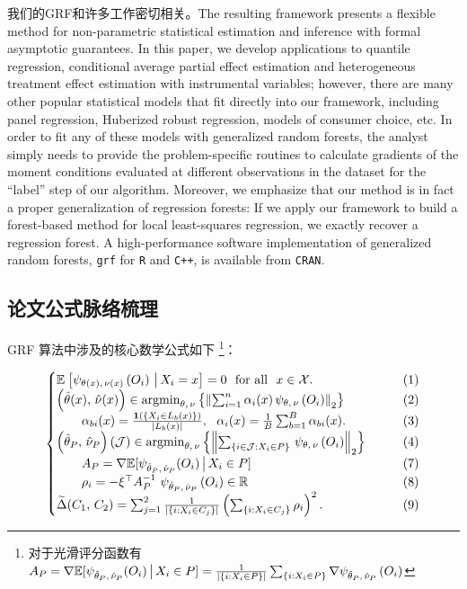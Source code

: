 \documentclass[aos]{imsart}
\theoremstyle{plain}
\theoremstyle{definition}
\theoremstyle{remark}
\begin{document}
\begin{CJK}{UTF8}{gbsn}
我们的GRF和许多工作密切相关。The resulting framework presents a flexible method for non-parametric
statistical estimation and inference with formal asymptotic guarantees. In this paper, we develop applications to quantile regression, conditional average partial effect estimation and heterogeneous treatment effect estimation with instrumental variables; however,
there are many other popular statistical models that fit directly into our framework, including panel regression, Huberized robust regression, models of consumer choice, etc. In order to fit any of these models with generalized random forests, the analyst simply needs to provide the problem-specific routines to calculate gradients of the moment conditions evaluated at different observations in the dataset for the ``label'' step of our algorithm. Moreover, we emphasize that our method is in fact a proper generalization of regression forests: If we apply our framework to build a forest-based method for local least-squares regression, 
we exactly recover a regression forest.
A high-performance software implementation of generalized random forests,
\texttt{grf} for \texttt{R} and \texttt{C++}, is available from \texttt{CRAN}.


\subsection{论文公式脉络梳理}

\noindent GRF 算法中涉及的核心数学公式如下 \footnote{对于光滑评分函数有 $A_P = \nabla \mathbb{E}[\psi_{\hat{\theta}_P, \, \hat{\nu}_P}(O_i) \,\big|\, X_i \in P] = \frac{1}{\left\lvert\left\{i : X_i \in P\right\}\right\rvert} \sum_{\left\{i : X_i \in P\right\}} \nabla \psi_{\hat{\theta}_P, \, \hat{\nu}_P}\left(O_i\right)$}：

\begin{equation*}
\begin{cases}
\EE{\psi_{\theta(x), \, \nu(x)}\p{O_i} \cond X_i = x} = 0 \ \text{ for all } \ x \in \xx. &\qquad (1) \\
\p{\htheta(x), \, \hnu(x)} \in \argmin_{\theta, \, \nu} \cb{\Norm{\sum_{i = 1}^n \alpha_i(x) \, \psi_{\theta, \, \nu}\p{O_i}}_2} &\qquad (2) \\
\qquad  \alpha_{bi}(x) = \frac{\1\p{\cb{X_i \in L_b(x)}}}{\abs{L_b(x)}}, \ \ \alpha_i(x) = \frac{1}{B} \sum_{b = 1}^B \alpha_{bi}(x).  &\qquad (3) \\
\p{\htheta_P, \, \hnu_P}(\mathcal{J}) \in \argmin_{\theta, \, \nu} \cb{\Norm{\sum_{\cb{i\in\mathcal{J} : X_i \in P}} \, \psi_{\theta, \, \nu}\p{O_i}}_2}   &\qquad (4) \\
\qquad A_P = \nabla \mathbb{E}[\psi_{\htheta_P, \, \hnu_P}(O_i) \cond X_i \in P]  &\qquad (7) \\
\qquad  \rho_i = -\xi^\top A_P^{-1} \ \psi_{\htheta_P, \, \hnu_P}\p{O_i} \in \RR &\qquad (8) \\
\tDelta(C_1, \, C_2) =  \sum_{j = 1}^2\frac{1}{\abs{\cb{i : X_i \in C_j}}}\p{ \sum_{\cb{i : X_i \in C_j}} \rho_i}^2. &\qquad (9)
\end{cases}
\end{equation*}


\end{CJK}
\end{document}
